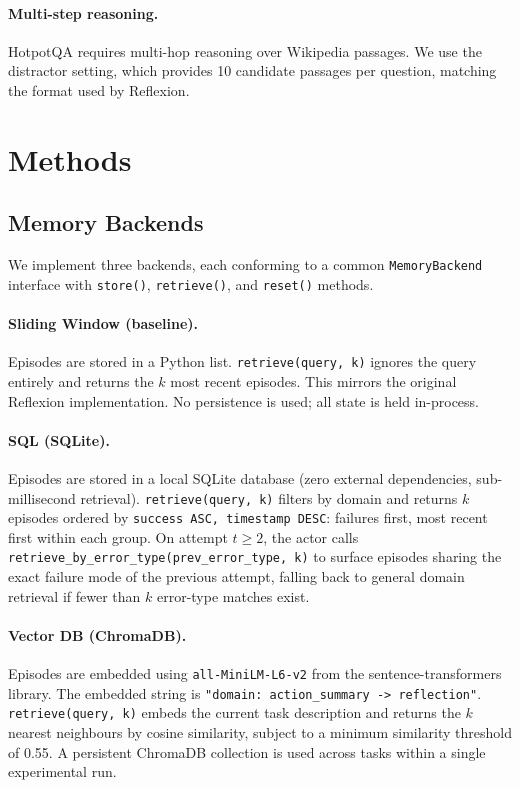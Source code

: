 \documentclass{article}
\begin{document}
\paragraph{Multi-step reasoning.}
HotpotQA \citep{yang2018hotpotqa} requires multi-hop reasoning over Wikipedia
passages. We use the distractor setting, which provides 10 candidate passages
per question, matching the format used by Reflexion.

\section{Methods}
\label{sec:methods}

\subsection{Memory Backends}

We implement three backends, each conforming to a common
\texttt{MemoryBackend} interface with \texttt{store()}, \texttt{retrieve()},
and \texttt{reset()} methods.

\paragraph{Sliding Window (baseline).}
Episodes are stored in a Python list. \texttt{retrieve(query, k)} ignores
the query entirely and returns the $k$ most recent episodes. This mirrors
the original Reflexion implementation. No persistence is used; all state
is held in-process.

\paragraph{SQL (SQLite).}
Episodes are stored in a local SQLite database (zero external dependencies,
sub-millisecond retrieval). \texttt{retrieve(query, k)} filters by domain
and returns $k$ episodes ordered by \texttt{success ASC, timestamp DESC}:
failures first, most recent first within each group. On attempt $t \geq 2$,
the actor calls \texttt{retrieve\_by\_error\_type(prev\_error\_type, k)} to
surface episodes sharing the exact failure mode of the previous attempt,
falling back to general domain retrieval if fewer than $k$ error-type
matches exist.

\paragraph{Vector DB (ChromaDB).}
Episodes are embedded using \texttt{all-MiniLM-L6-v2}
\citep{reimers2019sentencebert} from the sentence-transformers library.
The embedded string is
\texttt{"{domain}: {action\_summary} -> {reflection}"}. \texttt{retrieve(query,
k)} embeds the current task description and returns the $k$ nearest
neighbours by cosine similarity, subject to a minimum similarity threshold
of 0.55. A persistent ChromaDB collection is used across tasks within a
single experimental run.
\end{document}
